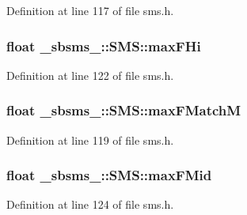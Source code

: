 Definition at line 117 of file sms.\+h.

\subsubsection[{\texorpdfstring{max\+F\+Hi}{maxFHi}}]{\setlength{\rightskip}{0pt plus 5cm}float \+\_\+sbsms\+\_\+\+::\+S\+M\+S\+::max\+F\+Hi\hspace{0.3cm}{\ttfamily [protected]}}\hypertarget{class__sbsms___1_1_s_m_s_a62e9972f9196d890e6658d60779d18c6}{}\label{class__sbsms___1_1_s_m_s_a62e9972f9196d890e6658d60779d18c6}


Definition at line 122 of file sms.\+h.

\subsubsection[{\texorpdfstring{max\+F\+MatchM}{maxFMatchM}}]{\setlength{\rightskip}{0pt plus 5cm}float \+\_\+sbsms\+\_\+\+::\+S\+M\+S\+::max\+F\+MatchM\hspace{0.3cm}{\ttfamily [protected]}}\hypertarget{class__sbsms___1_1_s_m_s_af416f187a9c0f700a3bab36f9fd9f0c7}{}\label{class__sbsms___1_1_s_m_s_af416f187a9c0f700a3bab36f9fd9f0c7}


Definition at line 119 of file sms.\+h.

\subsubsection[{\texorpdfstring{max\+F\+Mid}{maxFMid}}]{\setlength{\rightskip}{0pt plus 5cm}float \+\_\+sbsms\+\_\+\+::\+S\+M\+S\+::max\+F\+Mid\hspace{0.3cm}{\ttfamily [protected]}}\hypertarget{class__sbsms___1_1_s_m_s_a4945f83fd0b778c3fd7012e83c405b59}{}\label{class__sbsms___1_1_s_m_s_a4945f83fd0b778c3fd7012e83c405b59}


Definition at line 124 of file sms.\+h.

